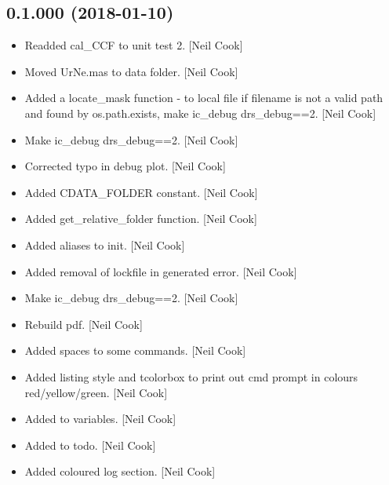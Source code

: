 \documentclass[a4paper,10pt,english]{report}
\begin{document}
\subsection{0.1.000 (2018-01-10)}
\label{\detokenize{misc/changelog:id502}}\begin{itemize}
\item {} 
Readded cal\_CCF to unit test 2. {[}Neil Cook{]}

\item {} 
Moved UrNe.mas to data folder. {[}Neil Cook{]}

\item {} 
Added a locate\_mask function - to local file if filename is not a
valid path and found by os.path.exists, make ic\_debug drs\_debug==2.
{[}Neil Cook{]}

\item {} 
Make ic\_debug drs\_debug==2. {[}Neil Cook{]}

\item {} 
Corrected typo in debug plot. {[}Neil Cook{]}

\item {} 
Added CDATA\_FOLDER constant. {[}Neil Cook{]}

\item {} 
Added get\_relative\_folder function. {[}Neil Cook{]}

\item {} 
Added aliases to init. {[}Neil Cook{]}

\item {} 
Added removal of lockfile in generated error. {[}Neil Cook{]}

\item {} 
Make ic\_debug drs\_debug==2. {[}Neil Cook{]}

\item {} 
Rebuild pdf. {[}Neil Cook{]}

\item {} 
Added spaces to some commands. {[}Neil Cook{]}

\item {} 
Added listing style and tcolorbox to print out cmd prompt in colours
red/yellow/green. {[}Neil Cook{]}

\item {} 
Added to variables. {[}Neil Cook{]}

\item {} 
Added to todo. {[}Neil Cook{]}

\item {} 
Added coloured log section. {[}Neil Cook{]}


\end{itemize}
\end{document}
